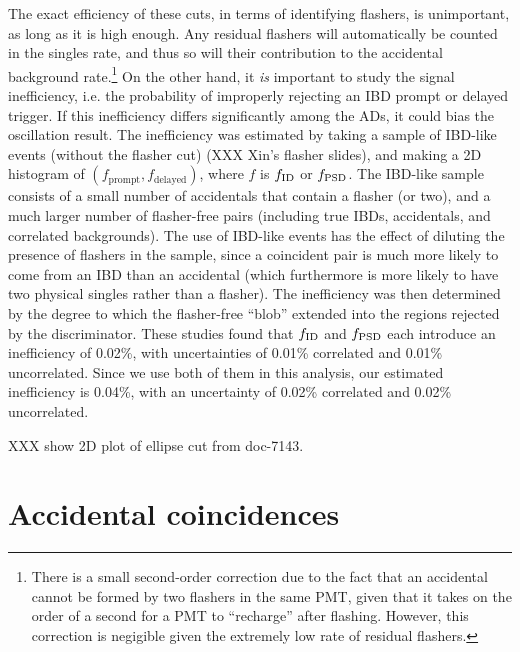 \documentclass[../thesis.tex]{subfiles}
\begin{document}
The exact efficiency of these cuts, in terms of identifying flashers, is
unimportant, as long as it is high enough. Any residual flashers will
automatically be counted in the singles rate, and thus so will their
contribution to the accidental background rate.\footnote{There is a small
  second-order correction due to the fact that an accidental cannot be formed by
  two flashers in the same PMT, given that it takes on the order of a second for
  a PMT to ``recharge'' after flashing. However, this correction is negigible
  given the extremely low rate of residual flashers.} On the other hand, it
\emph{is} important to study the signal inefficiency, i.e. the probability of
improperly rejecting an IBD prompt or delayed trigger. If this inefficiency
differs significantly among the ADs, it could bias the oscillation result. The
inefficiency was estimated by taking a sample of IBD-like events (without the
flasher cut) (XXX Xin's flasher slides), and making a 2D histogram of
$(f_{\mathrm{prompt}},f_{\mathrm{delayed}})$, where $f$ is $f_{\mathrm{ID}}$ or
$f_{\mathrm{PSD}}$. The IBD-like sample consists of a small number of accidentals that
contain a flasher (or two), and a much larger number of flasher-free pairs
(including true IBDs, accidentals, and correlated backgrounds). The use of
IBD-like events has the effect of diluting the presence of flashers in the
sample, since a coincident pair is much more likely to come from an IBD than an
accidental (which furthermore is more likely to have two physical singles rather
than a flasher). The inefficiency was then determined by the degree to which the
flasher-free ``blob'' extended into the regions rejected by the
discriminator. These studies found that $f_{\mathrm{ID}}$ and $f_{\mathrm{PSD}}$ each introduce an
inefficiency of 0.02\%, with uncertainties of 0.01\% correlated and 0.01\%
uncorrelated. Since we use both of them in this analysis, our estimated
inefficiency is 0.04\%, with an uncertainty of 0.02\% correlated and 0.02\%
uncorrelated.

XXX show 2D plot of ellipse cut from doc-7143.

\section{Accidental coincidences}
\label{sec:accbkg}
\end{document}
